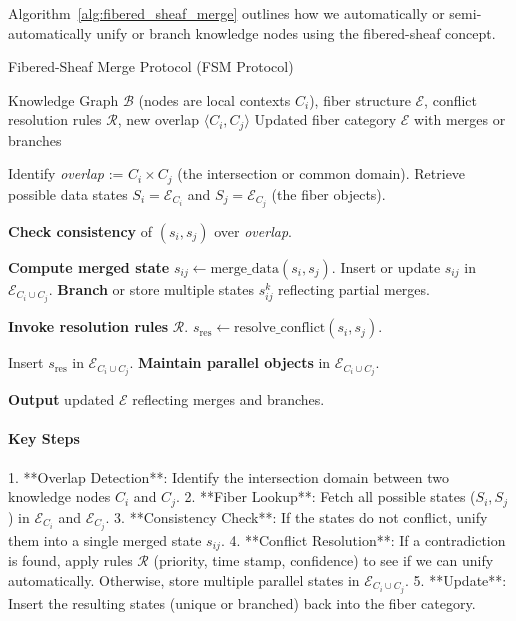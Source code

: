 \documentclass{article}
\begin{document}
Algorithm~\ref{alg:fibered_sheaf_merge} outlines how we automatically or semi-automatically unify or branch knowledge nodes using the fibered-sheaf concept.

\begin{algorithm}[t]
\caption{Fibered-Sheaf Merge Protocol (FSM Protocol)}
\label{alg:fibered_sheaf_merge}
\begin{algorithmic}[1]
\REQUIRE Knowledge Graph $\mathcal{B}$ (nodes are local contexts $C_i$), fiber structure $\mathcal{E}$, conflict resolution rules $\mathcal{R}$, new overlap $\langle C_i, C_j \rangle$
\ENSURE Updated fiber category $\mathcal{E}$ with merges or branches

\STATE Identify \textit{overlap} := $C_i \times C_j$ (the intersection or common domain).
\STATE Retrieve possible data states $S_i = \mathcal{E}_{C_i}$ and $S_j = \mathcal{E}_{C_j}$ (the fiber objects).

  \STATE \textbf{Check consistency} of $(s_i, s_j)$ over \textit{overlap}.

    \STATE \textbf{Compute merged state} $s_{ij} \gets \mathrm{merge\_data}(s_i, s_j)$.
      \STATE Insert or update $s_{ij}$ in $\mathcal{E}_{C_i \cup C_j}$.
    \ELSE
      \STATE \textbf{Branch} or store multiple states $s_{ij}^k$ reflecting partial merges.
    \ENDIF

  \ELSE
    \STATE \textbf{Invoke resolution rules} $\mathcal{R}$.
    \STATE $s_{\mathrm{res}} \gets \mathrm{resolve\_conflict}(s_i, s_j)$.

      \STATE %
      \STATE Insert $s_{\mathrm{res}}$ in $\mathcal{E}_{C_i \cup C_j}$.
    \ELSE
      \STATE \textbf{Maintain parallel objects} in $\mathcal{E}_{C_i \cup C_j}$.
    \ENDIF
  \ENDIF

\ENDFOR

\STATE \textbf{Output} updated $\mathcal{E}$ reflecting merges and branches.
\end{algorithmic}
\end{algorithm}

\paragraph{Key Steps}
1. **Overlap Detection**: Identify the intersection domain between two knowledge nodes $C_i$ and $C_j$.  
2. **Fiber Lookup**: Fetch all possible states ($S_i, S_j$) in $\mathcal{E}_{C_i}$ and $\mathcal{E}_{C_j}$.  
3. **Consistency Check**: If the states do not conflict, unify them into a single merged state $s_{ij}$.  
4. **Conflict Resolution**: If a contradiction is found, apply rules $\mathcal{R}$ (priority, time stamp, confidence) to see if we can unify automatically. Otherwise, store multiple parallel states in $\mathcal{E}_{C_i \cup C_j}$.  
5. **Update**: Insert the resulting states (unique or branched) back into the fiber category.  
\end{document}
